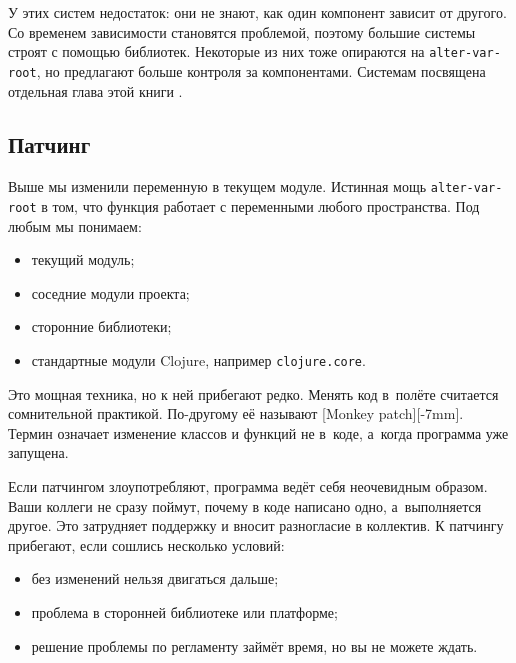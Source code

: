 У этих систем недостаток: они не знают, как один компонент зависит от
другого. Со временем зависимости становятся проблемой, поэтому большие системы
строят с помощью библиотек. Некоторые из них тоже опираются на
\verb|alter-var-root|, но предлагают больше контроля за компонентами. Системам
посвящена отдельная глава этой книги .

\subsection{Патчинг}


Выше мы изменили переменную в текущем модуле. Истинная мощь
\verb|alter-var-root| в том, что функция работает с переменными любого
пространства. Под любым мы понимаем:

\begin{itemize}

\item
  текущий модуль;

\item
  соседние модули проекта;

\item
  сторонние библиотеки;

\item
  стандартные модули Clojure, например \texttt{clo\-ju\-re.co\-re}.

\end{itemize}


Это мощная техника, но к ней прибегают редко. Менять код в~полёте считается
сомнительной практикой. По-другому её называют [Monkey patch][-7mm]. Термин означает изменение классов и функций не в~коде, а~когда программа уже запущена.

Если патчингом злоупотребляют, программа ведёт себя неочевидным образом. Ваши
коллеги не сразу поймут, почему в коде написано одно, а~выполняется другое. Это
затрудняет поддержку и вносит разногласие в коллектив. К патчингу прибегают,
если сошлись несколько условий:

\begin{itemize}

\item
  без изменений нельзя двигаться дальше;

\item
  проблема в сторонней библиотеке или платформе;

\item
  решение проблемы по регламенту займёт время, но вы не можете ждать.

\end{itemize}

